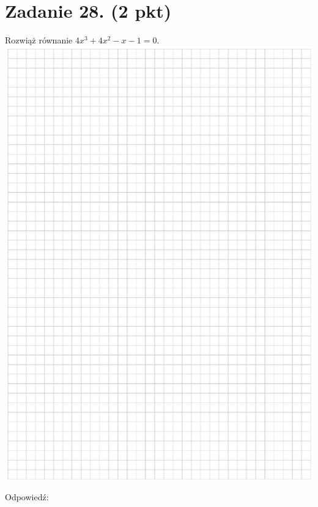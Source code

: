 \documentclass[10pt]{article}
\begin{document}
\section*{Zadanie 28. (2 pkt)}
Rozwiąż równanie \(4 x^{3}+4 x^{2}-x-1=0\).\\
\includegraphics[max width=\textwidth, center]{2024_11_21_e19607c15353cb4d7e48g-14}

Odpowiedź:
\end{document}
